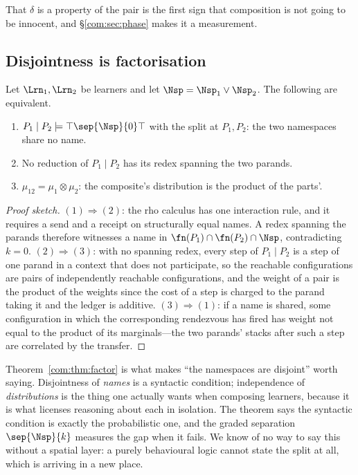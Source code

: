 That $\delta$ is a property of the pair is the first sign that composition is not going to be
innocent, and \S\ref{com:sec:phase} makes it a measurement.

\subsection{Disjointness is factorisation}\label{com:S4.2}

\begin{theorem}[Factorisation]\label{com:thm:factor}
Let $\Lrn_1, \Lrn_2$ be learners and let $\Nsp = \Nsp_1 \vee \Nsp_2$. The following are
equivalent.
\begin{enumerate}[label=(\arabic*)]
\item $P_1 \mid P_2 \models \top \sep{\Nsp}{0} \top$ with the split at $P_1, P_2$: the two
namespaces share no name.
\item No reduction of $P_1 \mid P_2$ has its redex spanning the two parands.
\item $\mu_{12} = \mu_1 \otimes \mu_2$: the composite's distribution is the product of the
parts'.
\end{enumerate}
\end{theorem}

\begin{proof}[Proof sketch]
$(1)\Rightarrow(2)$: the rho calculus has one interaction rule, and it requires a send and a
receipt on structurally equal names. A redex spanning the parands therefore witnesses a name in
$\fn(P_1) \cap \fn(P_2) \cap \Nsp$, contradicting $k=0$. $(2)\Rightarrow(3)$: with no spanning
redex, every step of $P_1\mid P_2$ is a step of one parand in a context that does not participate,
so the reachable configurations are pairs of independently reachable configurations, and the
weight of a pair is the product of the weights since the cost of a step is charged to the parand
taking it and the ledger is additive. $(3)\Rightarrow(1)$: if a name is shared, some
configuration in which the corresponding rendezvous has fired has weight not equal to the product
of its marginals---the two parands' stacks after such a step are correlated by the transfer.
\end{proof}

\begin{remark}\label{com:why-this-right-statement}
Theorem~\ref{com:thm:factor} is what makes ``the namespaces are disjoint'' worth saying. Disjointness
of \emph{names} is a syntactic condition; independence of \emph{distributions} is the thing one
actually wants when composing learners, because it is what licenses reasoning about each in
isolation. The theorem says the syntactic condition is exactly the probabilistic one, and the
graded separation $\sep{\Nsp}{k}$ measures the gap when it fails. We know of no way to say this
without a spatial layer: a purely behavioural logic cannot state the split at all, which is
\cite[Rem.~5]{ClassifierNote} arriving in a new place.
\end{remark}

